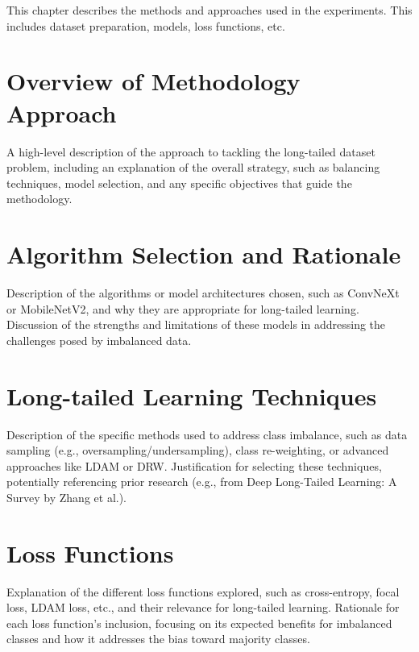 
This chapter describes the methods and approaches used in the experiments. This includes dataset preparation, models, loss functions, etc.

\section{Overview of Methodology Approach}
A high-level description of the approach to tackling the long-tailed dataset problem, including an explanation of the overall strategy, 
such as balancing techniques, model selection, and any specific objectives that guide the methodology.

\section{Algorithm Selection and Rationale}
Description of the algorithms or model architectures chosen, such as ConvNeXt or MobileNetV2, and why they are appropriate for long-tailed learning.
Discussion of the strengths and limitations of these models in addressing the challenges posed by imbalanced data.

\section{Long-tailed Learning Techniques}
Description of the specific methods used to address class imbalance, such as data sampling (e.g., oversampling/undersampling), class re-weighting, or advanced approaches like LDAM or DRW. 
Justification for selecting these techniques, potentially referencing prior research (e.g., from Deep Long-Tailed Learning: A Survey by Zhang et al.).


\section{Loss Functions}
Explanation of the different loss functions explored, such as cross-entropy, focal loss, LDAM loss, etc., and their relevance for long-tailed learning.
Rationale for each loss function's inclusion, focusing on its expected benefits for imbalanced classes and how it addresses the bias toward majority classes.

